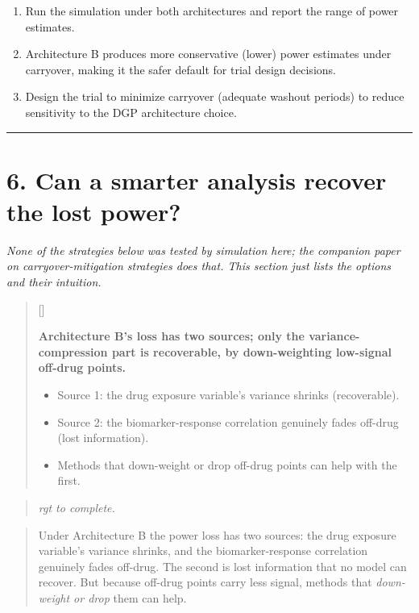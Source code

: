 \documentclass[
  11pt,
]{article}
\newcounter{pgraph}
\newenvironment{bullets}{%
  \stepcounter{pgraph}%
  \begin{quote}\small\sffamily\color[gray]{0.30}%
  {\normalfont\scriptsize\color[gray]{0.58}[\thepgraph]\enspace}}{%
  \end{quote}}
\newenvironment{rgt}{%
  \begin{quote}\small\itshape\color[RGB]{20,60,160}}{%
  \end{quote}}
\newenvironment{orig}{%
  \begin{quote}\normalsize\color[gray]{0.55}}{%
  \end{quote}}
\begin{document}
\begin{enumerate}
\item Run the simulation under both architectures and report the
  range of power estimates.
\item Architecture B produces more conservative (lower)
  power estimates under carryover, making it the safer default
  for trial design decisions.
\item Design the trial to minimize carryover (adequate washout
  periods) to reduce sensitivity to the DGP architecture choice.
\end{enumerate}

\bigskip\noindent

\rule{\textwidth}{0.4pt}\bigskip

\section{6. Can a smarter analysis recover the lost power?}

\emph{None of the strategies below was tested by simulation here;
the companion paper on carryover-mitigation strategies does that.
This section just lists the options and their intuition.}

\begin{bullets}

\textbf{Architecture B's loss has two sources; only the
variance-compression part is recoverable, by down-weighting
low-signal off-drug points.}

\begin{itemize}\setlength{\itemsep}{2pt}\setlength{\parskip}{0pt}
\item Source 1: the drug exposure variable's variance shrinks
(recoverable).
\item Source 2: the biomarker-response correlation genuinely fades
off-drug (lost information).
\item Methods that down-weight or drop off-drug points can help with
the first.
\end{itemize}

\end{bullets}

\begin{rgt}
rgt to complete.

\end{rgt}

\begin{orig}
Under Architecture B the power loss has two sources: the drug exposure
variable's variance shrinks, and the biomarker-response correlation
genuinely fades off-drug. The second is lost information that no model
can recover. But because off-drug points carry less signal, methods that
\emph{down-weight or drop} them can help.

\end{orig}
\end{document}
